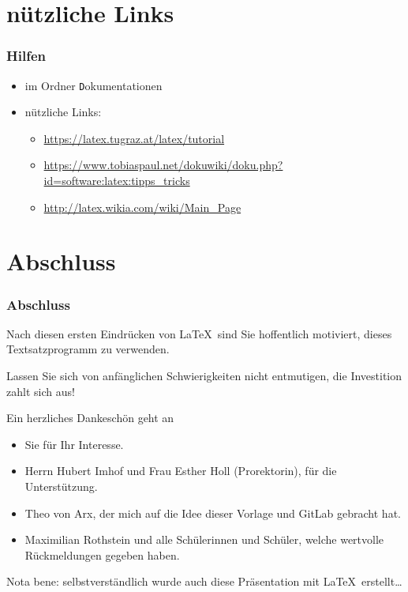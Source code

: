 \documentclass[11pt,german,aspectratio=169]{beamer}
\def\myColor{blue!80!white!70!green}                %
\newcommand{\thisColor}[1]{{\color{\myColor}#1}}    %
\newcommand{\tinyurl}[1]{{\tiny{\url{#1}}}}
\begin{document}

\section{nützliche Links}
\frame
{
	\frametitle{Hilfen}
	\begin{itemize}
		\item 	im Ordner {\texttt Dokumentationen}\\
	\item nützliche Links:
	\begin{itemize}
		\item \tinyurl{https://latex.tugraz.at/latex/tutorial}
		\item \tinyurl{https://www.tobiaspaul.net/dokuwiki/doku.php?id=software:latex:tipps_tricks}
		\item \tinyurl{http://latex.wikia.com/wiki/Main_Page}
	\end{itemize}
	\end{itemize}
	
}
\section{Abschluss}

\frame
{
	\frametitle{Abschluss}
Nach diesen ersten Eindrücken von \LaTeX\ sind Sie hoffentlich motiviert, dieses Textsatzprogramm zu verwenden.

Lassen Sie sich von anfänglichen Schwierigkeiten nicht entmutigen, die Investition zahlt sich aus!

\vspace{2ex}
\thisColor{Ein herzliches Dankeschön geht an}
	\begin{itemize}
		\item Sie für Ihr Interesse.
		\item Herrn Hubert Imhof und Frau Esther Holl (Prorektorin), für die Unterstützung.
		\item Theo von Arx, der mich auf die Idee dieser Vorlage und GitLab gebracht hat.
		\item Maximilian Rothstein und alle Schülerinnen und Schüler, welche wertvolle Rückmeldungen gegeben haben.
	\end{itemize}

\vfill
{\tiny
Nota bene: selbstverständlich wurde auch diese Präsentation mit \LaTeX\ erstellt\dots
}
}
\end{document}
